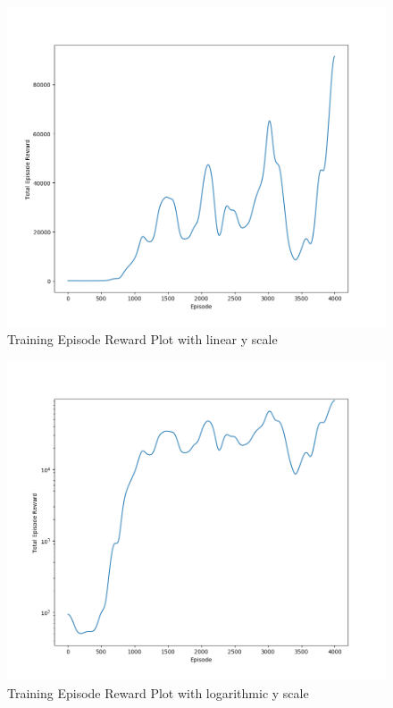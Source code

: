 \documentclass[Lau,oneside,noexaminfo]{sapthesis} %
\begin{document}
\begin{figure}[H]
  \centering
  \includegraphics[width=.8\textwidth]{reward}
  \caption{Training Episode Reward Plot with linear y scale}
  \label{rewardplot}
\end{figure}
\begin{figure}[H]
  \centering
  \includegraphics[width=.8\textwidth]{rewardlog}
  \caption{Training Episode Reward Plot with logarithmic y scale}
  \label{rewardplotlog}
\end{figure}

\end{document}
